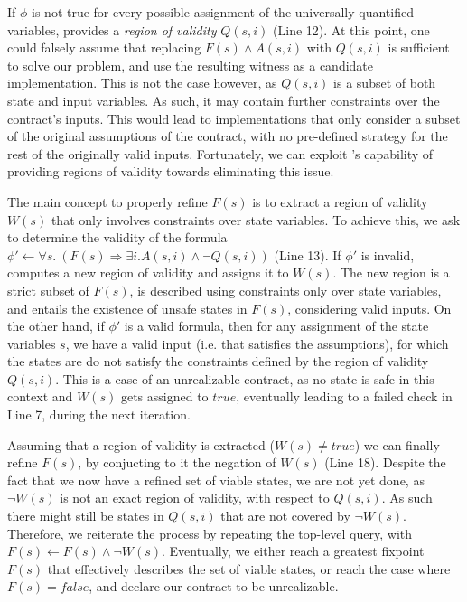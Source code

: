 If $\phi$ is not true for every possible assignment of the universally
quantified variables, \aeval provides a \textit{region of validity} $Q(s,i)$
(Line 12).
At this point, one could falsely assume that replacing $F(s) \land A(s,i)$ with
$Q(s,i)$ is sufficient to solve our problem, and use the resulting witness as a
candidate implementation. This is not the case however, as $Q(s,i)$ is a subset
of both state and input variables. As such, it may contain further constraints
over the contract's inputs. This would lead to implementations that only
consider a subset of the original assumptions of the contract, with no
pre-defined strategy for the rest of the originally valid inputs.
Fortunately, we can exploit \aeval's capability of providing regions of validity
towards eliminating this issue.

The main concept to properly refine $F(s)$ is to extract a region of validity $W(s)$
that only involves constraints over state variables. To achieve this, we ask \aeval to determine
the validity of the formula $\phi' \gets \forall s. \ (F(s) \Rightarrow \exists
i. A(s,i) \land \lnot Q(s,i))$ (Line 13). If $\phi'$ is invalid, \aeval computes
a new region of validity and assigns it to $W(s)$. The new region is a strict subset of
$F(s)$, is described using constraints only over state variables, and entails
the existence of unsafe states in $F(s)$, considering valid inputs.
On the other hand, if $\phi'$ is a valid formula, then for any assignment of the state variables $s$, we have a valid input (i.e. that
satisfies the assumptions), for which the states are do not satisfy the constraints defined by the region
of validity $Q(s,i)$. This is a case of an unrealizable contract, as no state is
safe in this context and $W(s)$ gets assigned to $true$, eventually leading to a failed check in Line 7, during the next iteration.

Assuming that a region of validity is extracted ($W(s) \neq true$) we can finally refine $F(s)$, by conjucting to it the negation of $W(s)$ (Line 18).
Despite the fact that we now have a refined set of viable states, we are not yet done,
as $\lnot W(s)$ is not an exact region of validity, with respect to $Q(s,i)$. As
such there might still be states in $Q(s,i)$ that are not covered by $\lnot W(s)$. Therefore, we reiterate the
process by repeating the top-level \aeval query, with $F(s) \gets F(s) \land \lnot
W(s)$. Eventually, we either reach a greatest fixpoint $F(s)$ that effectively
describes the set of viable states, or reach the case where $F(s) = false$, and
declare our contract to be unrealizable.

